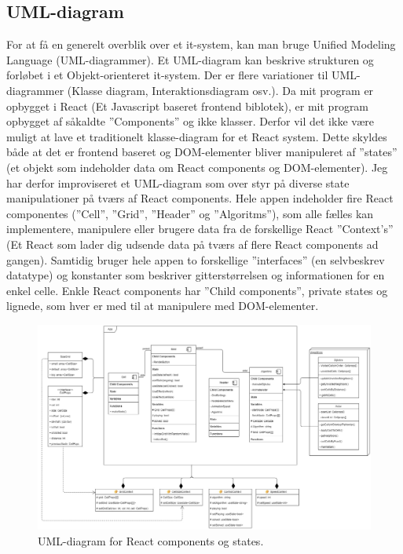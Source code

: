\documentclass[12pt]{article}
\begin{document}
\subsection{UML-diagram}
For at få en generelt overblik over et it-system, kan man bruge Unified Modeling Language (UML-diagrammer). Et UML-diagram kan beskrive strukturen og forløbet i et Objekt-orienteret it-system. Der er flere variationer til UML-diagrammer (Klasse diagram, Interaktionsdiagram osv.). 
Da mit program er opbygget i React (Et Javascript baseret frontend biblotek), er mit program opbygget af såkaldte ”Components” og ikke klasser. Derfor vil det ikke være muligt at lave et traditionelt klasse-diagram for et React system. Dette skyldes både at det er frontend baseret og DOM-elementer bliver manipuleret af ”states” (et objekt som indeholder data om React components og DOM-elementer). Jeg har derfor improviseret et UML-diagram som over styr på diverse state manipulationer på tværs af React components. 
Hele appen indeholder fire React componentes (”Cell”, ”Grid”, ”Header” og ”Algoritms”), som alle fælles kan implementere, manipulere eller brugere data fra de forskellige React ”Context's” (Et React som lader dig udsende data på tværs af flere React components ad gangen). Samtidig bruger hele appen to forskellige ”interfaces” (en selvbeskrev datatype) og konstanter som beskriver gitterstørrelsen og informationen for en enkel celle. Enkle React components har ”Child components”, private states og lignede, som hver er med til at manipulere med DOM-elementer. 
\begin{figure}[ht]\label{fig:UML}
  \centering
  \includegraphics[width=1.1\textwidth]{../UML.jpg}
  \caption{UML-diagram for React components og states.}
\end{figure}
\end{document}
